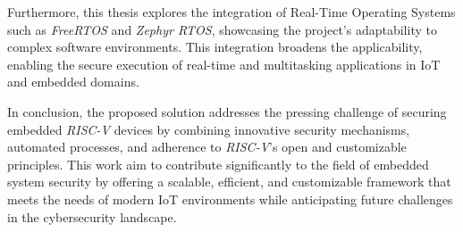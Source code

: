 Furthermore, this thesis explores the integration of Real-Time Operating Systems
such as \textit{FreeRTOS} and \textit{Zephyr RTOS}, showcasing the project's adaptability
to complex software environments. This integration broadens the applicability, enabling
the secure execution of real-time and multitasking applications in IoT and embedded
domains.

In conclusion, the proposed solution addresses the pressing challenge of
securing embedded \textit{RISC-V} devices by combining innovative security mechanisms,
automated processes, and adherence to \textit{RISC-V}'s open and customizable
principles. This work aim to contribute significantly to the field of embedded system
security by offering a scalable, efficient, and customizable framework that meets
the needs of modern IoT environments while anticipating future challenges in the
cybersecurity landscape.